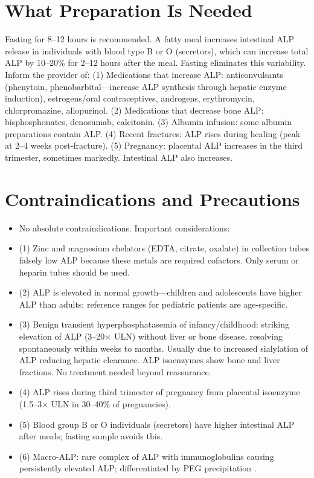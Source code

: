 \section*{What Preparation Is Needed}
Fasting for 8--12 hours is recommended. A fatty meal increases intestinal ALP release in individuals with blood type B or O (secretors), which can increase total ALP by 10--20\% for 2--12 hours after the meal. Fasting eliminates this variability. Inform the provider of: (1) Medications that increase ALP: anticonvulsants (phenytoin, phenobarbital---increase ALP synthesis through hepatic enzyme induction), estrogens/oral contraceptives, androgens, erythromycin, chlorpromazine, allopurinol. (2) Medications that decrease bone ALP: bisphosphonates, denosumab, calcitonin. (3) Albumin infusion: some albumin preparations contain ALP. (4) Recent fractures: ALP rises during healing (peak at 2--4 weeks post-fracture). (5) Pregnancy: placental ALP increases in the third trimester, sometimes markedly. Intestinal ALP also increases.

\section*{Contraindications and Precautions}
\begin{itemize}
  \item No absolute contraindications. Important considerations:
  \item (1) Zinc and magnesium chelators (EDTA, citrate, oxalate) in collection tubes falsely low ALP because these metals are required cofactors. Only serum or heparin tubes should be used.
  \item (2) ALP is elevated in normal growth---children and adolescents have higher ALP than adults; reference ranges for pediatric patients are age-specific.
  \item (3) Benign transient hyperphosphatasemia of infancy/childhood: striking elevation of ALP (3--20$\times$ ULN) without liver or bone disease, resolving spontaneously within weeks to months. Usually due to increased sialylation of ALP reducing hepatic clearance. ALP isoenzymes show bone and liver fractions. No treatment needed beyond reassurance.
  \item (4) ALP rises during third trimester of pregnancy from placental isoenzyme (1.5--3$\times$ ULN in 30--40\% of pregnancies).
  \item (5) Blood group B or O individuals (secretors) have higher intestinal ALP after meals; fasting sample avoids this.
  \item (6) Macro-ALP: rare complex of ALP with immunoglobulins causing persistently elevated ALP; differentiated by PEG precipitation \cite{wallach2022interpretation}.
\end{itemize}
